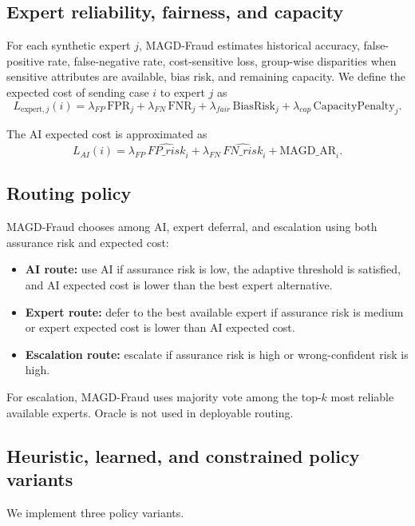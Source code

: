 \subsection{Expert reliability, fairness, and capacity}

For each synthetic expert $j$, MAGD-Fraud estimates historical accuracy, false-positive rate, false-negative rate, cost-sensitive loss, group-wise disparities when sensitive attributes are available, bias risk, and remaining capacity. We define the expected cost of sending case $i$ to expert $j$ as
\begin{equation}
L_{\text{expert},j}(i) =
\lambda_{FP}\,\text{FPR}_j +
\lambda_{FN}\,\text{FNR}_j +
\lambda_{fair}\,\text{BiasRisk}_j +
\lambda_{cap}\,\text{CapacityPenalty}_j.
\end{equation}

The AI expected cost is approximated as
\begin{equation}
L_{AI}(i) =
\lambda_{FP}\,\widehat{FP\_risk}_i +
\lambda_{FN}\,\widehat{FN\_risk}_i +
\text{MAGD\_AR}_i.
\end{equation}

\subsection{Routing policy}

MAGD-Fraud chooses among AI, expert deferral, and escalation using both assurance risk and expected cost:
\begin{itemize}
\item \textbf{AI route:} use AI if assurance risk is low, the adaptive threshold is satisfied, and AI expected cost is lower than the best expert alternative.
\item \textbf{Expert route:} defer to the best available expert if assurance risk is medium or expert expected cost is lower than AI expected cost.
\item \textbf{Escalation route:} escalate if assurance risk is high or wrong-confident risk is high.
\end{itemize}
For escalation, MAGD-Fraud uses majority vote among the top-$k$ most reliable available experts. Oracle is not used in deployable routing.

\subsection{Heuristic, learned, and constrained policy variants}

We implement three policy variants.

